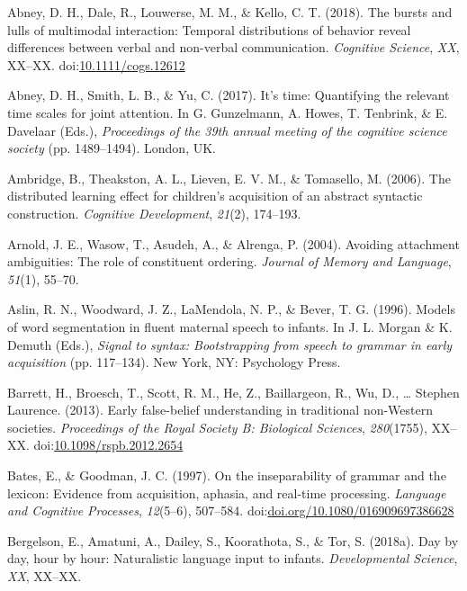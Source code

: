 \documentclass[floatsintext,man]{apa6}
\theoremstyle{definition}
\theoremstyle{definition}
\theoremstyle{definition}
\theoremstyle{remark}
\begin{document}
\hypertarget{refs}{}
\hypertarget{ref-abney2018bursts}{}
Abney, D. H., Dale, R., Louwerse, M. M., \& Kello, C. T. (2018). The
bursts and lulls of multimodal interaction: Temporal distributions of
behavior reveal differences between verbal and non-verbal communication.
\emph{Cognitive Science}, \emph{XX}, XX--XX.
doi:\href{https://doi.org/10.1111/cogs.12612}{10.1111/cogs.12612}

\hypertarget{ref-abney2017time}{}
Abney, D. H., Smith, L. B., \& Yu, C. (2017). It's time: Quantifying the
relevant time scales for joint attention. In G. Gunzelmann, A. Howes, T.
Tenbrink, \& E. Davelaar (Eds.), \emph{Proceedings of the 39th annual
meeting of the cognitive science society} (pp. 1489--1494). London, UK.

\hypertarget{ref-ambridge2006distributed}{}
Ambridge, B., Theakston, A. L., Lieven, E. V. M., \& Tomasello, M.
(2006). The distributed learning effect for children's acquisition of an
abstract syntactic construction. \emph{Cognitive Development},
\emph{21}(2), 174--193.

\hypertarget{ref-arnold2004avoiding}{}
Arnold, J. E., Wasow, T., Asudeh, A., \& Alrenga, P. (2004). Avoiding
attachment ambiguities: The role of constituent ordering. \emph{Journal
of Memory and Language}, \emph{51}(1), 55--70.

\hypertarget{ref-aslin1996models}{}
Aslin, R. N., Woodward, J. Z., LaMendola, N. P., \& Bever, T. G. (1996).
Models of word segmentation in fluent maternal speech to infants. In J.
L. Morgan \& K. Demuth (Eds.), \emph{Signal to syntax: Bootstrapping
from speech to grammar in early acquisition} (pp. 117--134). New York,
NY: Psychology Press.

\hypertarget{ref-barrett2013early}{}
Barrett, H., Broesch, T., Scott, R. M., He, Z., Baillargeon, R., Wu, D.,
\ldots{} Stephen Laurence. (2013). Early false-belief understanding in
traditional non-Western societies. \emph{Proceedings of the Royal
Society B: Biological Sciences}, \emph{280}(1755), XX--XX.
doi:\href{https://doi.org/10.1098/rspb.2012.2654}{10.1098/rspb.2012.2654}

\hypertarget{ref-bates1997inseparability}{}
Bates, E., \& Goodman, J. C. (1997). On the inseparability of grammar
and the lexicon: Evidence from acquisition, aphasia, and real-time
processing. \emph{Language and Cognitive Processes}, \emph{12}(5--6),
507--584.
doi:\href{https://doi.org/doi.org/10.1080/016909697386628}{doi.org/10.1080/016909697386628}

\hypertarget{ref-bergelson2018day}{}
Bergelson, E., Amatuni, A., Dailey, S., Koorathota, S., \& Tor, S.
(2018a). Day by day, hour by hour: Naturalistic language input to
infants. \emph{Developmental Science}, \emph{XX}, XX--XX.
\end{document}

